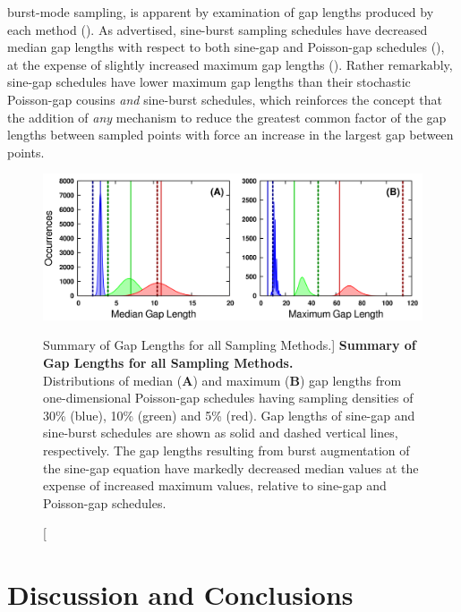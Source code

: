\begin{doublespace}
burst-mode sampling, is apparent by examination of gap lengths produced by
each method (). As advertised, sine-burst
sampling schedules have decreased median gap lengths with respect to both
sine-gap and Poisson-gap schedules (),
at the expense of slightly increased maximum gap lengths
(). Rather remarkably, sine-gap schedules
have lower maximum gap lengths than their stochastic Poisson-gap cousins
\emph{and} sine-burst schedules, which reinforces the concept that the
addition of \emph{any} mechanism to reduce the greatest common factor of
the gap lengths between sampled points with force an increase in the
largest gap between points.
\end{doublespace}


\begin{figure}[ht!]
\includegraphics[width=6in]{figs/dgs/10-gaps.png}
\caption
      [Summary of Gap Lengths for all Sampling Methods.]{
  {\bf Summary of Gap Lengths for all Sampling Methods.}
  \\
  Distributions of median ({\bf A}) and maximum ({\bf B}) gap lengths from
  one-dimensional Poisson-gap schedules having sampling densities of
  30\% (blue), 10\% (green) and 5\% (red). Gap lengths of sine-gap and
  sine-burst schedules are shown as solid and dashed vertical lines,
  respectively. The gap lengths resulting from burst augmentation of the
  sine-gap equation have markedly decreased median values at the expense
  of increased maximum values, relative to sine-gap and Poisson-gap schedules.
}
\label{figure.2.10}
\end{figure}

\section{Discussion and Conclusions}

